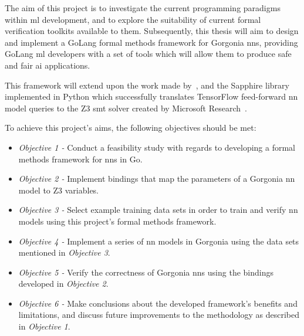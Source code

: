 
The aim of this project is to investigate the current programming paradigms within \gls{ml} development,
and to explore the suitability of current formal verification toolkits available to them. Subsequently,
this thesis will aim to design and implement a GoLang formal methods framework for Gorgonia \glspl{nn},
providing GoLang \gls{ml} developers with a set of tools which will allow them to produce safe and
fair \gls{ai} applications.

This framework will extend upon the work made by~\citep{kokke2020}, and the Sapphire library implemented in Python
which successfully translates TensorFlow feed-forward \gls{nn} model queries to the Z3 \Gls{smt} solver created by Microsoft Research~\citep{demoura2008}.



To achieve this project's aims, the following objectives should be met:

\begin{itemize}
    \setlength\itemsep{0em}
    \item \textit{Objective 1 -} Conduct a feasibility study with regards to developing a formal methods framework for \glspl{nn} in Go.
    \item \textit{Objective 2 -} Implement bindings that map the parameters of a Gorgonia \gls{nn} model to
        Z3 variables.
    \item \textit{Objective 3 -} Select example training data sets in order to train and verify \gls{nn} models using this project's formal methods framework.
    \item \textit{Objective 4 -} Implement a series of \gls{nn} models in Gorgonia using the data sets mentioned in \textit{Objective 3}.
    \item \textit{Objective 5 -} Verify the correctness of Gorgonia \glspl{nn} using the bindings developed in \textit{Objective 2}.
    \item \textit{Objective 6 -} Make conclusions about the developed framework's benefits and limitations, and discuss future improvements to the methodology as described in \textit{Objective 1}.
\end{itemize}
